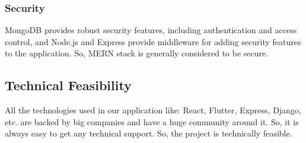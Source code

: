 \subsubsection{Security}
MongoDB provides robust security features, including authentication and access
control, and Node.js and Express provide middleware for adding security features to the application. So, MERN stack is generally considered to be secure.

\subsection{Technical Feasibility}
All the technologies used in our application like: React, Flutter, Express, Django, etc. are backed by big companies and have a huge community around it. So, it is always easy to get any technical support. So, the project is technically feasible.